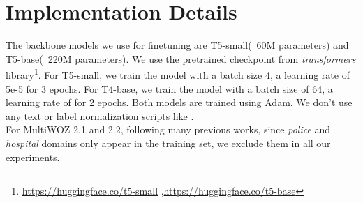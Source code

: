\documentclass[11pt]{article}
\begin{document}
\clearpage
\renewcommand{\appendixpagename}{Supplementary Material}
\appendix
\appendixpage


\section{Implementation Details}
The backbone models we use for finetuning are T5-small(~60M  parameters) and T5-base(~220M parameters). We use the pretrained checkpoint from \textit{transformers}  library\footnote{\url{https://huggingface.co/t5-small}
,\url{https://huggingface.co/t5-base}}. For T5-small, we train the model with a batch size 4, a learning rate of 5e-5 for 3 epochs. For T4-base, we train the model with a batch size of 64, a learning rate of  for 2 epochs. Both models are trained using Adam\cite{loshchilov2018decoupled}. We don't use any text or label normalization scripts like \cite{wu2019transferable,hosseini2020simple}.\\

For MultiWOZ 2.1 and 2.2, following many previous works\cite{wu2019transferable}, since \textit{police} and \textit{hospital} domains only appear in the training set, we exclude them in all our experiments.
\end{document}
